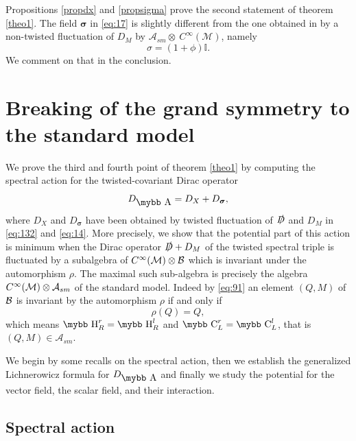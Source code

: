\documentclass[11pt]{article}
\newcommand{\cinf}{{C^\infty({\cal M})}}
\newcommand{\M}{\mathcal M}
\newcommand{\A}{\mathcal A}
\newcommand{\Ds}{\slashed D}
\newcommand{\sig}{{\boldsymbol{\sigma}}}
\def\bb#1{\hbox{\mybb#1}}
\begin{document}
\bigskip

Propositions \ref{propdx} and \ref{propsigma} prove the second
statement of theorem \ref{theo1}. The field $\boldsymbol \sigma$ in \eqref{eq:17} is slightly different from the one obtained in
\cite{Devastato:2013fk} by a non-twisted fluctuation of
$D_M$ by $\A_{sm}\otimes~C^\infty(\M)$, namely 
\begin{equation}
\sigma= (1+\phi)\mathbb I.
\label{eq:25}
\end{equation}
We comment on that in the conclusion.

\section{Breaking of the grand symmetry to the standard model}\setcounter{equation}{0}
\label{section:breaking}

We prove the third and fourth point of theorem \ref{theo1} by computing the
spectral action for the twisted-covariant
Dirac operator
\begin{equation}
D_{\bb A} = D_X + D_\sig,
\label{eq:198}
\end{equation}
where $D_X$ and $D_\sig$
have been obtained by twisted fluctuation of $\Ds$ and $D_M$ in
\eqref{eq:132} and \eqref{eq:14}. More precisely, we show that the
potential part of this action is minimum when the Dirac operator $\slashed D +
D_M$ of
the twisted spectral triple is fluctuated by a subalgebra of $ C^\infty(\M)\otimes {\cal B} $
which is invariant under the automorphism $\rho$. The maximal
such sub-algebra is precisely  the algebra $\cinf \otimes \A_{sm}$ of the standard
  model. Indeed  by \eqref{eq:91} an element $(Q,M)$ of $\cal B$ is invariant by
the automorphism $\rho$ if and only if
\begin{equation}
\rho(Q) = Q,
\label{eq:129}
\end{equation}
which means $\bb H_R^r = \bb H_R^l$ and $\bb C_L^r = \bb C_L^l$,
that is $(Q, M)\in \A_{sm}$.

We begin by some recalls on the spectral action, then we establish
the generalized Lichnerowicz formula for $D_{\bb A}$ and finally we
study the potential for the vector field, the scalar field, and their interaction.

\subsection{Spectral action}
\label{subsec:spectral}
\end{document}
